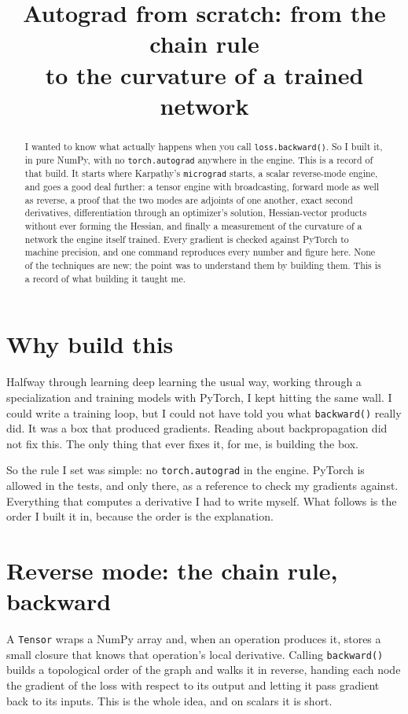 \documentclass[conference]{IEEEtran}
\title{Autograd from scratch: from the chain rule\\ to the curvature of a trained network}
\author{\IEEEauthorblockN{Pranav Kumar}
\IEEEauthorblockA{University of California, Irvine\\
\texttt{pkumar4@uci.edu} \quad \texttt{github.com/krrpranav/autograd-from-scratch}}}
\begin{document}
\maketitle

\begin{abstract}
I wanted to know what actually happens when you call \texttt{loss.backward()}. So I built
it, in pure NumPy, with no \texttt{torch.autograd} anywhere in the engine. This is a record
of that build. It starts where Karpathy's \texttt{micrograd} starts, a scalar reverse-mode
engine, and goes a good deal further: a tensor engine with broadcasting, forward mode as
well as reverse, a proof that the two modes are adjoints of one another, exact second
derivatives, differentiation through an optimizer's solution, Hessian-vector products
without ever forming the Hessian, and finally a measurement of the curvature of a network
the engine itself trained. Every gradient is checked against PyTorch to machine precision,
and one command reproduces every number and figure here. None of the techniques are new;
the point was to understand them by building them. This is a record of what building it
taught me.
\end{abstract}

\section{Why build this}

Halfway through learning deep learning the usual way, working through a specialization and
training models with PyTorch, I kept hitting the same wall. I could write a training loop,
but I could not have told you what \texttt{backward()} really did. It was a box that
produced gradients. Reading about backpropagation did not fix this. The only thing that
ever fixes it, for me, is building the box.

So the rule I set was simple: no \texttt{torch.autograd} in the engine. PyTorch is allowed
in the tests, and only there, as a reference to check my gradients against. Everything that
computes a derivative I had to write myself. What follows is the order I built it in,
because the order is the explanation.

\section{Reverse mode: the chain rule, backward}

A \texttt{Tensor} wraps a NumPy array and, when an operation produces it, stores a small
closure that knows that operation's local derivative. Calling \texttt{backward()} builds a
topological order of the graph and walks it in reverse, handing each node the gradient of
the loss with respect to its output and letting it pass gradient back to its inputs. This
is the whole idea, and on scalars it is short.
\end{document}
